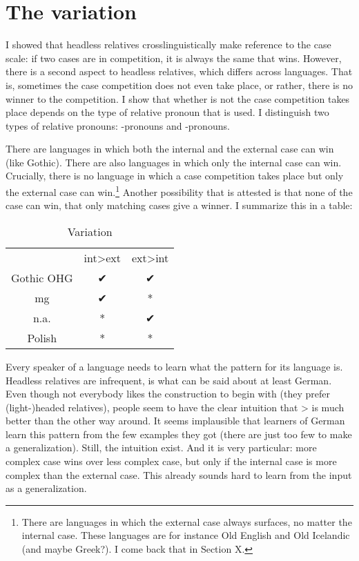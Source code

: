 
\chapter{The variation}

I showed that headless relatives crosslinguistically make reference to the case scale: if two cases are in competition, it is always the same that wins.
However, there is a second aspect to headless relatives, which differs across languages. That is, sometimes the case competition does not even take place, or rather, there is no winner to the competition. I show that whether is not the case competition takes place depends on the type of relative pronoun that is used. I distinguish two types of relative pronouns: -pronouns and -pronouns.

There are languages in which both the internal and the external case can win (like Gothic). There are also languages in which only the internal case can win. Crucially, there is no language in which a case competition takes place but only the external case can win.\footnote{
There are languages in which the external case always surfaces, no matter the internal case. These languages are for instance Old English and Old Icelandic (and maybe Greek?). I come back that in Section X.
}
Another possibility that is attested is that none of the case can win, that only matching cases give a winner. I summarize this in a table:

\begin{table}[H]
 \center
 \caption {Variation}
  \begin{tabular}{ccc}
  \toprule
        & \ac{int}>\ac{ext}  & \ac{ext}>\ac{int} \\
        \cmidrule{2-3}
  Gothic OHG  & ✔          & ✔         \\
  \ac{mg}  & ✔           & *         \\
  n.a.     & *          & ✔         \\
    Polish    & *                   & *                 \\
  \bottomrule
  \end{tabular}
\end{table}

Every speaker of a language needs to learn what the pattern for its language is. Headless relatives are infrequent, is what can be said about at least German. Even though not everybody likes the construction to begin with (they prefer (light-)headed relatives), people seem to have the clear intuition that > is much better than the other way around. It seems implausible that learners of German learn this pattern from the few examples they got (there are just too few to make a generalization). Still, the intuition exist. And it is very particular: more complex case wins over less complex case, but only if the internal case is more complex than the external case. This already sounds hard to learn from the input as a generalization.

